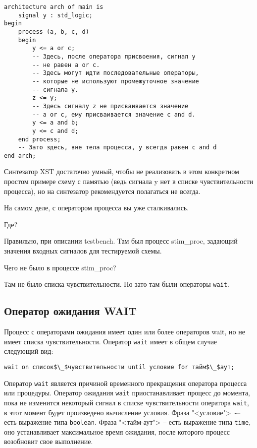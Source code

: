 \begin{Code}
\begin{lstlisting}
architecture arch of main is
    signal y : std_logic;
begin
    process (a, b, c, d)
    begin
        y <= a or c;
        -- Здесь, после оператора присвоения, сигнал y 
        -- не равен a or c.
        -- Здесь могут идти последовательные операторы, 
        -- которые не используют промежуточное значение
        -- сигнала y.
        z <= y;
        -- Здесь сигналу z не присваивается значение  
        -- a or c, ему присваивается значение c and d.
        y <= a and b;
        y <= c and d;
    end process;
    -- Зато здесь, вне тела процесса, y всегда равен c and d
end arch;
\end{lstlisting}
\end{Code}

 Синтезатор XST достаточно умный, чтобы не реализовать в этом конкретном простом примере схему с памятью (ведь сигнала y нет в списке чувствительности процесса), но на синтезатор рекомендуется полагаться не всегда.

На самом деле, с оператором процесса вы уже сталкивались.

 Где?

 Правильно, при описании testbench. Там был процесс stim\_proc, задающий значения входных сигналов для тестируемой схемы.

 Чего не было в процессе stim\_proc?

 Там не было списка чувствительности. Но зато там были операторы \lstinline?wait?.

\subsection{Оператор ожидания WAIT}

Процесс с операторами ожидания имеет один или более операторов wait, но не имеет списка чувствительности. Оператор \lstinline?wait? имеет в общем случае следующий вид:

\begin{Code}
\begin{lstlisting}[mathescape]
wait on список$\_$чувствительности until условие for тайм$\_$аут;
\end{lstlisting}
\end{Code}

Оператор \lstinline?wait? является причиной временного прекращения оператора процесса или процедуры. Оператор ожидания \lstinline?wait? приостанавливает процесс до момента, пока не изменится некоторый сигнал в списке чувствительности оператора \lstinline?wait?, в этот момент будет произведено вычисление условия. Фраза "<условие">~-– есть выражение типа \lstinline?boolean?. Фраза "<тайм-аут"> – есть выражение типа \lstinline?time?, оно устанавливает максимальное время ожидания, после которого процесс возобновит свое выполнение.

